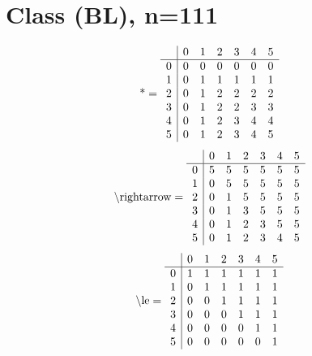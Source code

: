 \documentclass[11pt]{article}
\begin{document}
\section{Class (BL), n=111}
\[\text{*} = 
\begin{array}{r | r r r r r r}
 & 0 & 1 & 2 & 3 & 4 & 5 \\ \hline
0 & 0 & 0 & 0 & 0 & 0 & 0 \\
1 & 0 & 1 & 1 & 1 & 1 & 1 \\
2 & 0 & 1 & 2 & 2 & 2 & 2 \\
3 & 0 & 1 & 2 & 2 & 3 & 3 \\
4 & 0 & 1 & 2 & 3 & 4 & 4 \\
5 & 0 & 1 & 2 & 3 & 4 & 5 \\
\end{array}
\]
\[\text{\textbackslash rightarrow} = 
\begin{array}{r | r r r r r r}
 & 0 & 1 & 2 & 3 & 4 & 5 \\ \hline
0 & 5 & 5 & 5 & 5 & 5 & 5 \\
1 & 0 & 5 & 5 & 5 & 5 & 5 \\
2 & 0 & 1 & 5 & 5 & 5 & 5 \\
3 & 0 & 1 & 3 & 5 & 5 & 5 \\
4 & 0 & 1 & 2 & 3 & 5 & 5 \\
5 & 0 & 1 & 2 & 3 & 4 & 5 \\
\end{array}
\]
\[\text{\textbackslash le} = 
\begin{array}{r | r r r r r r}
 & 0 & 1 & 2 & 3 & 4 & 5 \\ \hline
0 & 1 & 1 & 1 & 1 & 1 & 1 \\
1 & 0 & 1 & 1 & 1 & 1 & 1 \\
2 & 0 & 0 & 1 & 1 & 1 & 1 \\
3 & 0 & 0 & 0 & 1 & 1 & 1 \\
4 & 0 & 0 & 0 & 0 & 1 & 1 \\
5 & 0 & 0 & 0 & 0 & 0 & 1 \\
\end{array}
\]
\end{document}
